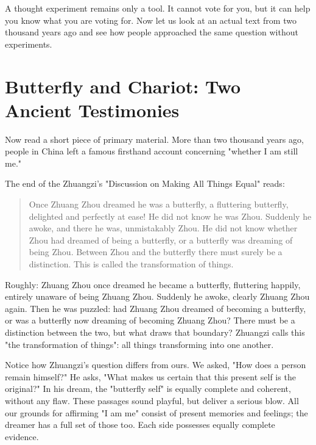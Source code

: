 A thought experiment remains only a tool. It cannot vote for you, but it can help you know what you are voting for. Now let us look at an actual text from two thousand years ago and see how people approached the same question without experiments.

\section[Butterfly and Chariot]{Butterfly and Chariot: Two Ancient Testimonies}
Now read a short piece of primary material. More than two thousand years ago, people in China left a famous firsthand account concerning "whether I am still me."

The end of the Zhuangzi's "Discussion on Making All Things Equal" reads:

\begin{quote}
Once Zhuang Zhou dreamed he was a butterfly, a fluttering butterfly, delighted and perfectly at ease! He did not know he was Zhou. Suddenly he awoke, and there he was, unmistakably Zhou. He did not know whether Zhou had dreamed of being a butterfly, or a butterfly was dreaming of being Zhou. Between Zhou and the butterfly there must surely be a distinction. This is called the transformation of things.
\end{quote}
Roughly: Zhuang Zhou once dreamed he became a butterfly, fluttering happily, entirely unaware of being Zhuang Zhou. Suddenly he awoke, clearly Zhuang Zhou again. Then he was puzzled: had Zhuang Zhou dreamed of becoming a butterfly, or was a butterfly now dreaming of becoming Zhuang Zhou? There must be a distinction between the two, but what draws that boundary? Zhuangzi calls this "the transformation of things": all things transforming into one another.

Notice how Zhuangzi's question differs from ours. We asked, "How does a person remain himself?" He asks, "What makes us certain that this present self is the original?" In his dream, the "butterfly self" is equally complete and coherent, without any flaw. These passages sound playful, but deliver a serious blow. All our grounds for affirming "I am me" consist of present memories and feelings; the dreamer has a full set of those too. Each side possesses equally complete evidence.

